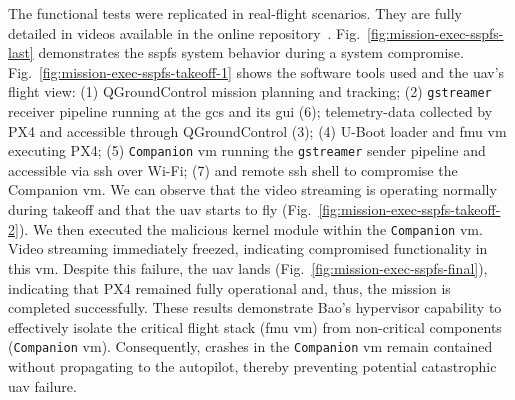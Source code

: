 The functional tests were replicated in real-flight scenarios. They are fully
detailed in videos available in the online repository~\cite{thesis-sw-github}.
Fig.~\ref{fig:mission-exec-sspfs-last} demonstrates the \gls{sspfs} system behavior
during a system compromise. Fig.~\ref{fig:mission-exec-sspfs-takeoff-1} shows
the software tools used and the \gls{uav}'s flight view: (1) QGroundControl
mission planning and tracking; (2) \lstinline{gstreamer} receiver pipeline
running at the \gls{gcs} and its \gls{gui} (6); telemetry-data collected by PX4
and accessible through QGroundControl (3); (4) U-Boot loader and
\gls{fmu} \gls{vm} executing PX4; (5) \lstinline{Companion}
\gls{vm} running the \lstinline{gstreamer} sender pipeline and accessible via
\gls{ssh} over Wi-Fi; (7) and remote \gls{ssh} shell to compromise the Companion
\gls{vm}. We can observe that the video streaming is operating normally during
takeoff and that the \gls{uav} starts to fly (Fig.~\ref{fig:mission-exec-sspfs-takeoff-2}).
We then executed the malicious kernel module within the \lstinline{Companion}
\gls{vm}. Video streaming immediately freezed, indicating compromised
functionality in this \gls{vm}. Despite this failure, the \gls{uav} lands (Fig.~\ref{fig:mission-exec-sspfs-final}),
indicating that PX4 remained fully operational and, thus, the mission is completed successfully.
%
These results demonstrate Bao's hypervisor capability to effectively isolate the
critical flight stack (\gls{fmu} \gls{vm}) from non-critical components
(\lstinline{Companion} \gls{vm}).
Consequently, crashes in the \lstinline{Companion} \gls{vm} remain contained without propagating to the autopilot, thereby preventing potential catastrophic \gls{uav} failure.

